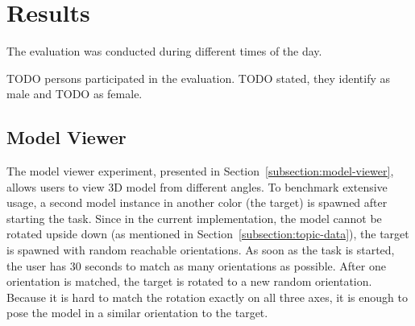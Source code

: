 \section{Results}\label{section:eval-results}

The evaluation was conducted during different times of the day. %


TODO persons participated in the evaluation. TODO stated, they identify as male and TODO as female. 

\subsection{Model Viewer}\label{section:eval-res-mv}

The model viewer experiment, presented in Section~\ref{subsection:model-viewer}, allows users to view \ac{3D} model from different angles. To benchmark extensive usage, a second model instance in another color (the target) is spawned after starting the task. Since in the current implementation, the model cannot be rotated upside down (as mentioned in Section~\ref{subsection:topic-data}), the target is spawned with random reachable orientations.
As soon as the task is started, the user has 30 seconds to match as many orientations as possible. After one orientation is matched, the target is rotated to a new random orientation.
Because it is hard to match the rotation exactly on all three axes, it is enough to pose the model in a similar orientation to the target.
